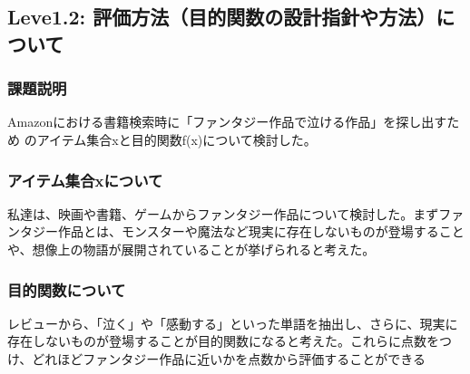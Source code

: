 \subsection{Leve1.2: 評価方法（目的関数の設計指針や方法）について}
\subsubsection{課題説明}
Amazonにおける書籍検索時に「ファンタジー作品で泣ける作品」を探し出すため
のアイテム集合xと目的関数f(x)について検討した。

\subsubsection{アイテム集合xについて}
私達は、映画や書籍、ゲームからファンタジー作品について検討した。まずファンタジー作品とは、モンスターや魔法など現実に存在しないものが登場することや、想像上の物語が展開されていることが挙げられると考えた。

\subsubsection{目的関数について}
レビューから、「泣く」や「感動する」といった単語を抽出し、さらに、現実に存在しないものが登場することが目的関数になると考えた。これらに点数をつけ、どれほどファンタジー作品に近いかを点数から評価することができる



